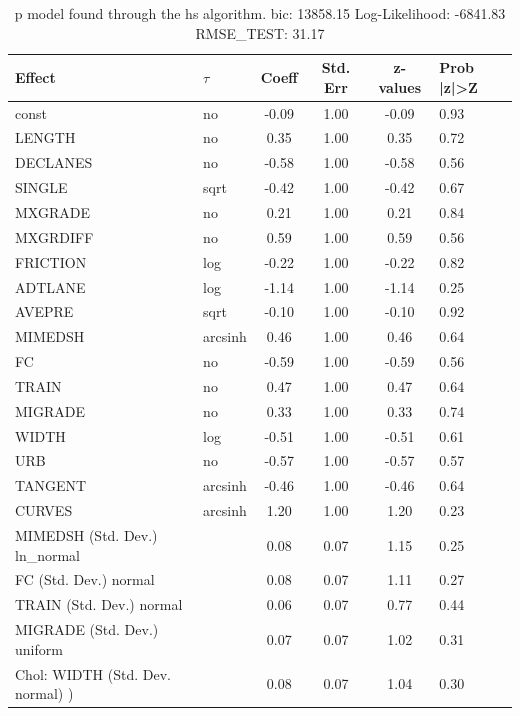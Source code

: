 \begin{table}
	\caption{p model found through the hs algorithm. bic: 13858.15 Log-Likelihood: -6841.83 RMSE_TEST: 31.17}
	\begin{center}
		\begin{tabular}{|l|l|c|c|c|l|}
			\hline
			Effect & $\tau$ & Coeff & Std. Err & z-values & Prob |z|>Z \\
			\hline
			const & no & -0.09 & 1.00 & -0.09 & 0.93 \\
			\hline
			LENGTH & no & 0.35 & 1.00 & 0.35 & 0.72 \\
			\hline
			DECLANES & no & -0.58 & 1.00 & -0.58 & 0.56 \\
			\hline
			SINGLE & sqrt & -0.42 & 1.00 & -0.42 & 0.67 \\
			\hline
			MXGRADE & no & 0.21 & 1.00 & 0.21 & 0.84 \\
			\hline
			MXGRDIFF & no & 0.59 & 1.00 & 0.59 & 0.56 \\
			\hline
			FRICTION & log & -0.22 & 1.00 & -0.22 & 0.82 \\
			\hline
			ADTLANE & log & -1.14 & 1.00 & -1.14 & 0.25 \\
			\hline
			AVEPRE & sqrt & -0.10 & 1.00 & -0.10 & 0.92 \\
			\hline
			MIMEDSH & arcsinh & 0.46 & 1.00 & 0.46 & 0.64 \\
			\hline
			FC & no & -0.59 & 1.00 & -0.59 & 0.56 \\
			\hline
			TRAIN & no & 0.47 & 1.00 & 0.47 & 0.64 \\
			\hline
			MIGRADE & no & 0.33 & 1.00 & 0.33 & 0.74 \\
			\hline
			WIDTH & log & -0.51 & 1.00 & -0.51 & 0.61 \\
			\hline
			URB & no & -0.57 & 1.00 & -0.57 & 0.57 \\
			\hline
			TANGENT & arcsinh & -0.46 & 1.00 & -0.46 & 0.64 \\
			\hline
			CURVES & arcsinh & 1.20 & 1.00 & 1.20 & 0.23 \\
			\hline
			MIMEDSH (Std. Dev.) ln_normal &  & 0.08 & 0.07 & 1.15 & 0.25 \\
			\hline
			FC (Std. Dev.) normal &  & 0.08 & 0.07 & 1.11 & 0.27 \\
			\hline
			TRAIN (Std. Dev.) normal &  & 0.06 & 0.07 & 0.77 & 0.44 \\
			\hline
			MIGRADE (Std. Dev.) uniform &  & 0.07 & 0.07 & 1.02 & 0.31 \\
			\hline
			 Chol: WIDTH (Std. Dev. normal) ) &  & 0.08 & 0.07 & 1.04 & 0.30 \\

\end{tabular}
\end{center}
\end{table}
